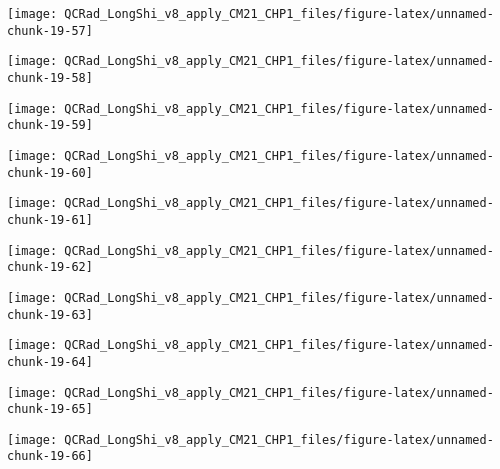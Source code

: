\documentclass[
  10pt,
  a4paper,oneside]{article}
\begin{document}
\begin{center}\texttt{[image: QCRad\_LongShi\_v8\_apply\_CM21\_CHP1\_files/figure-latex/unnamed-chunk-19-57]} \end{center}

\begin{center}\texttt{[image: QCRad\_LongShi\_v8\_apply\_CM21\_CHP1\_files/figure-latex/unnamed-chunk-19-58]} \end{center}

\begin{center}\texttt{[image: QCRad\_LongShi\_v8\_apply\_CM21\_CHP1\_files/figure-latex/unnamed-chunk-19-59]} \end{center}

\begin{center}\texttt{[image: QCRad\_LongShi\_v8\_apply\_CM21\_CHP1\_files/figure-latex/unnamed-chunk-19-60]} \end{center}

\begin{center}\texttt{[image: QCRad\_LongShi\_v8\_apply\_CM21\_CHP1\_files/figure-latex/unnamed-chunk-19-61]} \end{center}

\begin{center}\texttt{[image: QCRad\_LongShi\_v8\_apply\_CM21\_CHP1\_files/figure-latex/unnamed-chunk-19-62]} \end{center}

\begin{center}\texttt{[image: QCRad\_LongShi\_v8\_apply\_CM21\_CHP1\_files/figure-latex/unnamed-chunk-19-63]} \end{center}

\begin{center}\texttt{[image: QCRad\_LongShi\_v8\_apply\_CM21\_CHP1\_files/figure-latex/unnamed-chunk-19-64]} \end{center}

\begin{center}\texttt{[image: QCRad\_LongShi\_v8\_apply\_CM21\_CHP1\_files/figure-latex/unnamed-chunk-19-65]} \end{center}

\begin{center}\texttt{[image: QCRad\_LongShi\_v8\_apply\_CM21\_CHP1\_files/figure-latex/unnamed-chunk-19-66]} \end{center}
\end{document}
